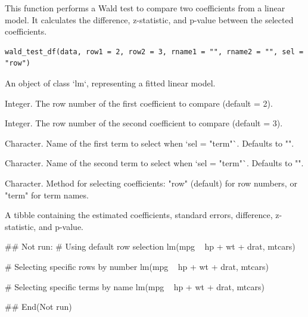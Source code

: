 \documentclass[a4paper]{book}
\begin{document}
%
\begin{Description}
This function performs a Wald test to compare two coefficients from a linear model.
It calculates the difference, z-statistic, and p-value between the selected coefficients.
\end{Description}
%
\begin{Usage}
\begin{verbatim}
wald_test_df(data, row1 = 2, row2 = 3, rname1 = "", rname2 = "", sel = "row")
\end{verbatim}
\end{Usage}
%
\begin{Arguments}
\begin{ldescription}
\item[\code{data}] An object of class `lm`, representing a fitted linear model.

\item[\code{row1}] Integer. The row number of the first coefficient to compare (default = 2).

\item[\code{row2}] Integer. The row number of the second coefficient to compare (default = 3).

\item[\code{rname1}] Character. Name of the first term to select when `sel = "term"`. Defaults to "".

\item[\code{rname2}] Character. Name of the second term to select when `sel = "term"`. Defaults to "".

\item[\code{sel}] Character. Method for selecting coefficients: "row" (default) for row numbers,
or "term" for term names.
\end{ldescription}
\end{Arguments}
%
\begin{Value}
A tibble containing the estimated coefficients, standard errors, difference, z-statistic,
and p-value.
\end{Value}
%
\begin{Examples}
\begin{ExampleCode}
## Not run: 
# Using default row selection
lm(mpg ~ hp + wt + drat, mtcars) %

# Selecting specific rows by number
lm(mpg ~ hp + wt + drat, mtcars) %

# Selecting specific terms by name
lm(mpg ~ hp + wt + drat, mtcars) %

## End(Not run)
\end{ExampleCode}
\end{Examples}
\end{document}
